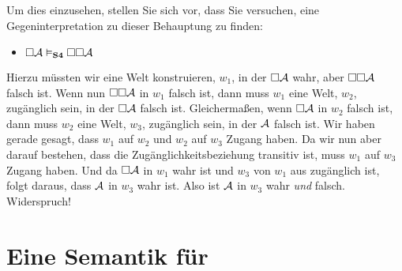Um dies einzusehen, stellen Sie sich vor, dass Sie versuchen, eine Gegeninterpretation zu dieser Behauptung zu finden:
\begin{itemize}
	\item[]$\Box\mathcal{A} \vDash_{\mathbf{S4}} \Box \Box \mathcal{A}$
\end{itemize}
Hierzu müssten wir eine Welt konstruieren, $w_1$, in der $\Box\mathcal{A}$ wahr, aber $\Box \Box \mathcal{A}$ falsch ist. Wenn nun $\Box \Box \mathcal{A}$ in $w_1$ falsch ist, dann muss $w_1$ eine Welt, $w_2$, zugänglich sein, in der $\Box\mathcal{A}$ falsch ist. Gleichermaßen, wenn $\Box \mathcal{A}$ in $w_2$ falsch ist, dann muss $w_2$ eine Welt, $w_3$, zugänglich sein, in der $\mathcal{A}$ falsch ist. Wir haben gerade gesagt, dass $w_1$ auf $w_2$ und $w_2$ auf $w_3$ Zugang haben. Da wir nun aber darauf bestehen, dass die Zugänglichkeitsbeziehung transitiv ist, muss $w_1$ auf $w_3$ Zugang haben. Und da $\Box\mathcal{A}$ in $w_1$ wahr ist und $w_3$ von $w_1$ aus zugänglich ist, folgt daraus, dass $\mathcal{A}$ in $w_3$ wahr ist. Also ist $\mathcal{A}$ in $w_3$ wahr \emph{und} falsch. Widerspruch!

\section{Eine Semantik für \mlSfive}
\label{SemanticsS5}

